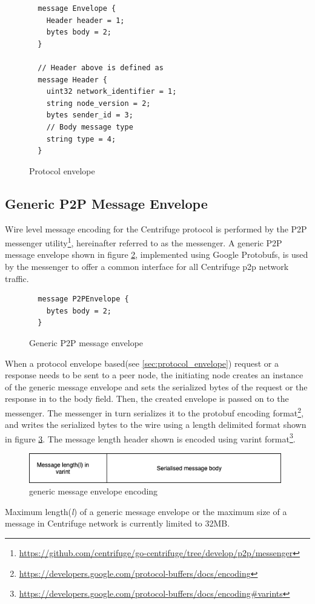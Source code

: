 \begin{figure}[h]
  \caption{Protocol envelope}
  \label{fig:protocol_envelope}
  \begin{lstlisting}
  message Envelope {
    Header header = 1;
    bytes body = 2;
  }

  // Header above is defined as
  message Header {
    uint32 network_identifier = 1;
    string node_version = 2;
    bytes sender_id = 3;
    // Body message type
    string type = 4;
  }\end{lstlisting}
\end{figure}



\subsection{Generic P2P Message Envelope}
Wire level message encoding for the Centrifuge protocol is performed by the P2P messenger utility\footnote{\url{https://github.com/centrifuge/go-centrifuge/tree/develop/p2p/messenger}}, hereinafter referred to as the messenger. A generic P2P message envelope shown in figure \ref{fig:generic_envelope}, implemented using Google Protobufs, is used by the messenger to offer a common interface for all Centrifuge p2p network traffic. 

\begin{figure}[h]
  \caption{Generic P2P message envelope}
  \label{fig:generic_envelope}
  \begin{lstlisting}
  message P2PEnvelope {
    bytes body = 2;
  }\end{lstlisting}
\end{figure}

When a protocol envelope based(see \ref{sec:protocol_envelope}) request or a response needs to be sent to a peer node, the initiating node creates an instance of the generic message envelope and sets the serialized bytes of the request or the response in to the body field. Then, the created envelope is passed on to the messenger. The messenger in turn serializes it to the protobuf encoding format\footnote{\url{https://developers.google.com/protocol-buffers/docs/encoding}}, and writes the serialized bytes to the wire using a length delimited format shown in figure \ref{img:generic_message_encoding}. The message length header shown is encoded using varint format\footnote{\url{https://developers.google.com/protocol-buffers/docs/encoding\#varints}}.

\begin{figure}[h]
  \centering
  \includegraphics[width=11cm]{img/generic-message-encoding.png}
  \caption{generic message envelope encoding} 
  \label{img:generic_message_encoding}
\end{figure}

Maximum length(\textit{l}) of a generic message envelope or the maximum size of a message in Centrifuge network is currently limited to 32MB.





